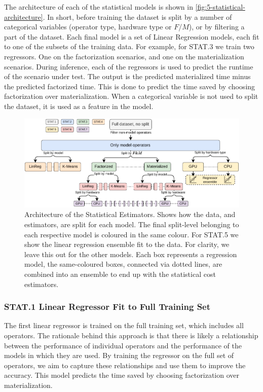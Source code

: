 The architecture of each of the statistical models is shown in \autoref{fig:5-statistical-architecture}. In short, before training the dataset is split by a number of categorical variables (operator type, hardware type or $F$/$M$), or by filtering a part of the dataset. Each final model is a set of Linear Regression models, each fit to one of the subsets of the training data. For example, for STAT.3 we train two regressors. One on the factorization scenarios, and one on the materialization scenarios. During inference, each of the regressors is used to predict the runtime of the scenario under test. The output is the predicted materialized time minus the predicted factorized time. This is done to predict the time saved by choosing factorization over materialization. When a categorical variable is not used to split the dataset, it is used as a feature in the model.

\begin{figure}[ht]
    \centering
    \includegraphics[width=\linewidth]{chapters/05_cost_estimation/figures/statistical-architecture.pdf}
    \caption[Statistical Estimator Architecture]{Architecture of the Statistical Estimators. Shows how the data, and estimators, are split for each model. The final split-level belonging to each respective model is coloured in the same colour. For STAT.5 we show the linear regression ensemble fit to the data. For clarity, we leave this out for the other models. Each box represents a regression model, the same-coloured boxes, connected via dotted lines, are combined into an ensemble to end up with the statistical cost estimators.}
    \label{fig:5-statistical-architecture}
\end{figure}

\subsubsection*{STAT.1 Linear Regressor Fit to Full Training Set}
The first linear regressor is trained on the full training set, which includes all operators. The rationale behind this approach is that there is likely a relationship between the performance of individual operators and the performance of the models in which they are used. By training the regressor on the full set of operators, we aim to capture these relationships and use them to improve the accuracy. This model predicts the time saved by choosing factorization over materialization.

